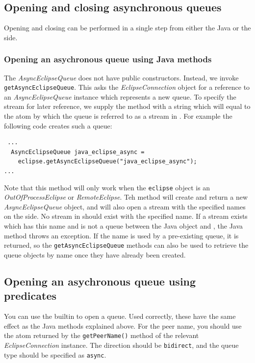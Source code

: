\subsection{Opening and closing asynchronous queues}
\label{sec:ji-async-open-close}
Opening and closing can be performed in a single step from
either the Java or the {\eclipse} side.

\subsubsection*{Opening an asychronous queue using Java methods}

The {\it AsyncEclipseQueue} does not have public
constructors. Instead, we invoke {\tt getAsyncEclipseQueue}.
This asks the {\it EclipseConnection} object for a
reference to an {\it AsyncEclipseQueue} instance
which represents a new queue. To specify the stream for later
reference, we supply the method with a string which will equal to the
atom by which the queue is referred to as a stream in {\eclipse}. For
example the following code creates such a queue:
\begin{verbatim} ...
  AsyncEclipseQueue java_eclipse_async = 
    eclipse.getAsyncEclipseQueue("java_eclipse_async");
...
\end{verbatim}
Note that this method will only work when the {\tt eclipse} object is
an {\it OutOfProcessEclipse} or {\it RemoteEclipse}.
Teh method will create and return a new {\it AsyncEclipseQueue}
object, and will also open a stream with the
specified names on the {\eclipse} side. No stream in {\eclipse} should
exist with the specified name. If a stream exists which has this name
and is not a queue between the Java object and {\eclipse}, the Java
method throws an exception. If the name is used by a pre-existing
queue, it is returned, so the {\tt getAsyncEclipseQueue}
methods can also be used to retrieve the queue
objects by name once they have already been created.

\subsection*{Opening an asychronous queue using {\eclipse} predicates}
You can use the {\eclipse} builtin  to open a
queue. Used correctly, these have the same effect as the Java methods
explained above. For the peer name, you should use the atom returned
by the {\tt getPeerName()} method of the relevant {\it
EclipseConnection} instance. The direction should be {\tt bidirect},
and the queue type should be specified as {\tt async}.

